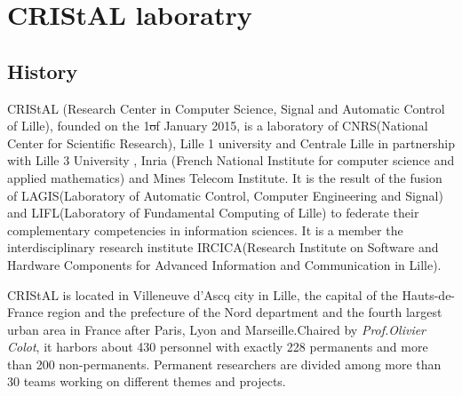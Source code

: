 \chapter{CRIStAL laboratry}

\section{History}

CRIStAL\footnotemark[1]\cite{cristal} (Research Center in Computer Science, Signal and Automatic Control of Lille), founded on the 1\st of January 2015, is a laboratory of CNRS\footnotemark[2] (National Center for Scientific Research), Lille 1 university and Centrale Lille in partnership with Lille 3 University , Inria (French National Institute for computer science and applied mathematics) and Mines Telecom Institute. It is the result of the fusion of LAGIS\footnotemark[4] (Laboratory of Automatic Control, Computer Engineering and Signal) and LIFL\footnotemark[4] (Laboratory of Fundamental Computing of Lille) to federate their complementary competencies in information sciences. It is a member the interdisciplinary research institute IRCICA\footnotemark[5] (Research Institute on Software and Hardware Components for Advanced Information and Communication in Lille). \\






CRIStAL is located in Villeneuve d'Ascq city in Lille, the capital of  the Hauts-de-France region and the prefecture of the Nord department and the fourth largest urban area in France after Paris, Lyon and Marseille.Chaired by \textit{Prof.Olivier Colot}, it harbors about 430 personnel with exactly 228 permanents and more than 200 non-permanents. Permanent researchers are divided among more than 30 teams working on different themes and projects.

